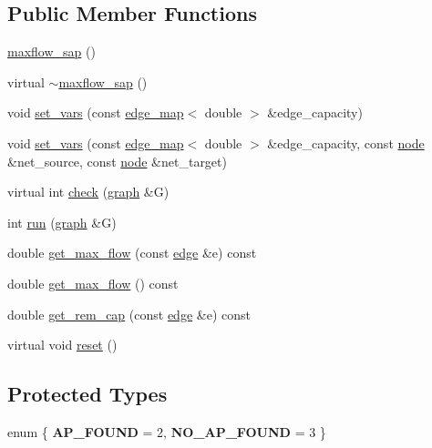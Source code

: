 \subsection*{Public Member Functions}
\begin{DoxyCompactItemize}
\item 
\mbox{\hyperlink{classmaxflow__sap_affc6e05aaa6d1b1455c99d6b5595a838}{maxflow\+\_\+sap}} ()
\item 
virtual \mbox{\hyperlink{classmaxflow__sap_ab49914afde43ffa0e5c3049cc063a8d2}{$\sim$maxflow\+\_\+sap}} ()
\item 
void \mbox{\hyperlink{classmaxflow__sap_ac50ba0330c169c7ce697947a76702e13}{set\+\_\+vars}} (const \mbox{\hyperlink{classedge__map}{edge\+\_\+map}}$<$ double $>$ \&edge\+\_\+capacity)
\item 
void \mbox{\hyperlink{classmaxflow__sap_a936f6afa25de80046c7bd69dc47fdfa9}{set\+\_\+vars}} (const \mbox{\hyperlink{classedge__map}{edge\+\_\+map}}$<$ double $>$ \&edge\+\_\+capacity, const \mbox{\hyperlink{classnode}{node}} \&net\+\_\+source, const \mbox{\hyperlink{classnode}{node}} \&net\+\_\+target)
\item 
virtual int \mbox{\hyperlink{classmaxflow__sap_aa2974bf25fb597677848fdb23c12d338}{check}} (\mbox{\hyperlink{classgraph}{graph}} \&G)
\item 
int \mbox{\hyperlink{classmaxflow__sap_ab4305a2bb370ad9c43cc68d339b2dda0}{run}} (\mbox{\hyperlink{classgraph}{graph}} \&G)
\item 
double \mbox{\hyperlink{classmaxflow__sap_ae90889b16323a2af0ab13e04c87953a5}{get\+\_\+max\+\_\+flow}} (const \mbox{\hyperlink{classedge}{edge}} \&e) const
\item 
double \mbox{\hyperlink{classmaxflow__sap_a81251d546cbdabc837f24fc3caf9fe0d}{get\+\_\+max\+\_\+flow}} () const
\item 
double \mbox{\hyperlink{classmaxflow__sap_a634835664542d5d181e1b63b99dda36c}{get\+\_\+rem\+\_\+cap}} (const \mbox{\hyperlink{classedge}{edge}} \&e) const
\item 
virtual void \mbox{\hyperlink{classmaxflow__sap_a14574d2f9ce31a3cdeb0888e57fc0616}{reset}} ()
\end{DoxyCompactItemize}
\subsection*{Protected Types}
\begin{DoxyCompactItemize}
\item 
\mbox{\label{classmaxflow__sap_ac30ce6f46eb2dc97b557297c48989f8e}} 
enum \{ {\bfseries A\+P\+\_\+\+F\+O\+U\+ND} = 2, 
{\bfseries N\+O\+\_\+\+A\+P\+\_\+\+F\+O\+U\+ND} = 3
 \}
\end{DoxyCompactItemize}
